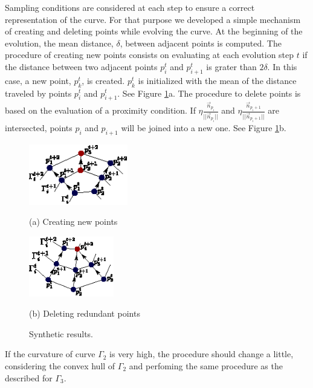 \documentclass{article}
\begin{document}
Sampling conditions are considered at each step to ensure a correct
representation of the curve. For that purpose we developed a simple
mechanism of creating and deleting points while evolving the curve. At
the beginning of the evolution, the mean distance, $\delta$, between
adjacent points is computed. The procedure of creating new points
consists on evaluating at each evolution step $t$ if the distance
between two adjacent points $p_i^t$ and $p_{i+1}^t$ is grater than
$2\delta$. In this case, a new point, $p_k^t$, is created. $p_k^t$ is
initialized with the mean of the distance traveled by points $p_i^t$
and $p_{i+1}^t$. See Figure \ref{fig:nacimiento_y_muerte}a. The
procedure to delete points is based on the evaluation of a proximity
condition. If $\eta\frac{\vec{n}_{p_i}}{||\vec{n}_{p_i}||}$ and
$\eta\frac{\vec{n}_{p_i+1}}{||\vec{n}_{p_i+1}||}$ are intersected,
points $p_i$ and $p_{i+1}$ will be joined into a new one. See Figure
\ref{fig:nacimiento_y_muerte}b.
\begin{figure}[t]
  \begin{minipage}[b]{.5\linewidth}
    \centering
    \centerline{\includegraphics[width=4.3cm]{pics/nacimiento}}
    \centerline{(a) Creating new points}\medskip
  \end{minipage}
  \hfill
  \begin{minipage}[b]{.48\linewidth}
    \centering
    \centerline{\includegraphics[width=3.7cm]{pics/muerte}}
    \centerline{(b) Deleting redundant points}\medskip
  \end{minipage}
  \caption{Synthetic results.}
  \label{fig:nacimiento_y_muerte}
\end{figure}
If the curvature of curve $\Gamma_2$ is very high, the procedure
should change a little, considering the convex hull of $\Gamma_2$ and
perfoming the same procedure as the described for $\Gamma_3$.
\end{document}
